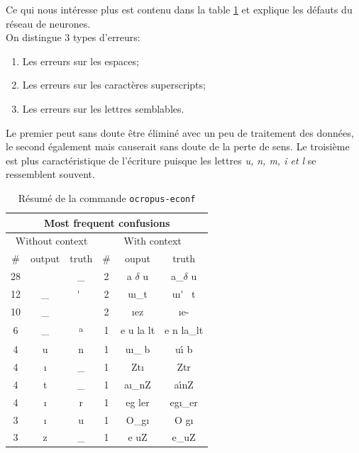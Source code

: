 \documentclass{article}
\newcommand\upt{\textsuperscript}
\begin{document}
Ce qui nous intéresse plus est contenu dans la table \ref{t3} et explique les défauts du réseau de neurones. \\
On distingue 3 types d'erreurs:
\begin{enumerate}[parsep=0.1cm,itemsep=0.1cm,topsep=0.1cm]
    \item Les erreurs sur les espaces;
    \item Les erreurs sur les caractères superscripts;
    \item Les erreurs sur les lettres semblables. 
\end{enumerate}

\noindent Le premier peut sans doute être éliminé avec un peu de traitement des données, le second également mais causerait sans doute de la perte de sens. Le troisième est plus caractéristique de l'écriture puisque les lettres \textit{u, n, m, i et l} se ressemblent souvent.

\begin{table}[!h]
    \centering
    \begin{tabular}{|ccc|ccc|}
        \hline
        \multicolumn{6}{|c|}{\cellcolor[gray]{0.8} Most frequent confusions}                         \\ \hline
        \multicolumn{3}{|c|}{\cellcolor[gray]{0.9}Without context} & \multicolumn{3}{c|}{\cellcolor[gray]{0.9}With context} \\ \hline
        \#       & output       & truth       & \#   & ouput       & truth        \\ \hline
        28       &              &     \_      & 2    & a $\delta$ u  & a\_$\delta$ u        \\
        12       & \_           & \'~         & 2    & uı\_t        & uı\'~ t    \\
        10       & \_           &             & 2    & ıez         &  ıe-       \\
        6        & \_           & \upt{a}      & 1    & e u la lt   & e n la\_lt   \\
        4        & u            & n           & 1    & uı\_ b      & u\'{ı} b        \\
        4        & ı            & \_          & 1    & Ztı         & Ztr         \\
        4        & t            & \_          & 1    & aı\_nZ      & a\'{ı}nZ        \\
        4        & ı            &  r          & 1    & eg ler      & egı\_er      \\
        3        & ı            & u           & 1    & O\_gı       & O gı         \\
        3        & z            & \_          & 1    & e uZ        & e\_uZ        \\ \hline
    \end{tabular}
    \caption{Résumé de la commande \texttt{ocropus-econf}}
    \label{t3}
\end{table}
\end{document}
